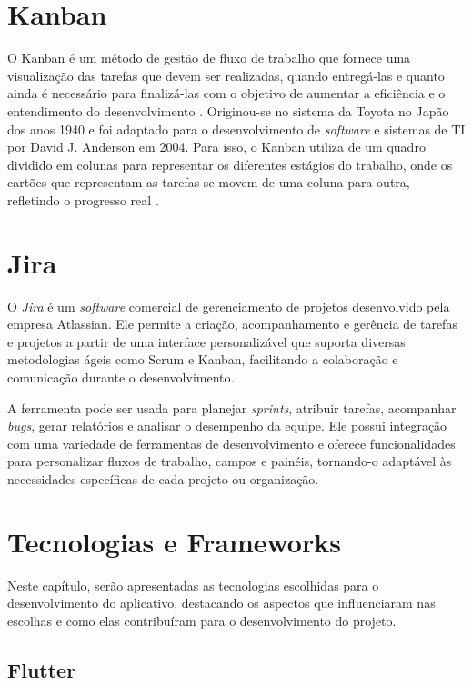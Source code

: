 \section{Kanban}

O Kanban é um método de gestão de fluxo de trabalho que fornece uma visualização das tarefas que devem ser realizadas, quando entregá-las e quanto ainda é necessário para finalizá-las com o objetivo de aumentar a eficiência e o entendimento do desenvolvimento \cite{ohno1988toyota}. Originou-se no sistema da Toyota no Japão dos anos 1940 e foi adaptado para o desenvolvimento de \textit{software} e sistemas de TI por David J. Anderson em 2004. Para isso, o Kanban utiliza de um quadro dividido em colunas para representar os diferentes estágios do trabalho, onde os cartões que representam as tarefas se movem de uma coluna para outra, refletindo o progresso real \cite{zayat2020framework}.

\section{Jira}

O \textit{Jira} é um \textit{software} comercial de gerenciamento de projetos desenvolvido pela empresa Atlassian. Ele permite a criação, acompanhamento e gerência de tarefas e projetos a partir de uma interface personalizável que suporta diversas metodologias ágeis como Scrum e Kanban, facilitando a colaboração e comunicação durante o desenvolvimento.

A ferramenta pode ser usada para planejar \textit{sprints}, atribuir tarefas, acompanhar \textit{bugs}, gerar relatórios e analisar o desempenho da equipe. Ele possui integração com uma variedade de ferramentas de desenvolvimento e oferece funcionalidades para personalizar fluxos de trabalho, campos e painéis, tornando-o adaptável às necessidades específicas de cada projeto ou organização.


\section{Tecnologias e Frameworks}\label{tecnologias}

Neste capítulo, serão apresentadas as tecnologias escolhidas para o 
desenvolvimento do aplicativo, destacando os aspectos que influenciaram nas 
escolhas e como elas contribuíram para o desenvolvimento do projeto.

\subsection{Flutter}

